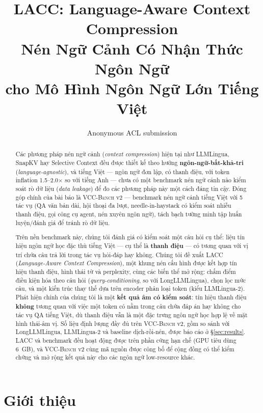 \documentclass[12pt,a4paper]{article}
\title{\textbf{LACC: Language-Aware Context Compression \\
        Nén Ngữ Cảnh Có Nhận Thức Ngôn Ngữ \\
        cho Mô Hình Ngôn Ngữ Lớn Tiếng Việt}}
\author{Anonymous ACL submission}
\date{}
\newcommand{\method}[1]{\textsc{#1}}         %
\begin{document}
\maketitle

\begin{abstract}
Các phương pháp nén ngữ cảnh (\textit{context compression}) hiện tại như LLMLingua, SnapKV hay Selective Context đều được thiết kế theo hướng \textbf{ngôn-ngữ-bất-khả-tri} (\textit{language-agnostic}), và tiếng Việt --- ngôn ngữ đơn lập, có thanh điệu, với token inflation 1.5--2.0$\times$ so với tiếng Anh --- chưa có một benchmark nén ngữ cảnh nào kiểm soát rò dữ liệu (\textit{data leakage}) để đo các phương pháp này một cách đáng tin cậy. Đóng góp chính của bài báo là \method{VCC-Bench} v2 --- benchmark nén ngữ cảnh tiếng Việt với 5 tác vụ (QA văn bản dài, hội thoại đa lượt, needle-in-haystack có kiểm soát nhiễu thanh điệu, gọi công cụ agent, nén xuyên ngôn ngữ), tách bạch tường minh tập huấn luyện/đánh giá để tránh rò dữ liệu.

Trên nền benchmark này, chúng tôi đánh giá có kiểm soát một câu hỏi cụ thể: liệu tín hiệu ngôn ngữ học đặc thù tiếng Việt --- cụ thể là \textbf{thanh điệu} --- có tương quan với vị trí chứa câu trả lời trong tác vụ hỏi-đáp hay không. Chúng tôi đề xuất \method{LACC} (\textit{Language-Aware Context Compression}), một khung nén cấu hình được kết hợp tín hiệu thanh điệu, hình thái từ và perplexity, cùng các biến thể mở rộng: chấm điểm điều kiện hóa theo câu hỏi (\textit{query-conditioning}, so với LongLLMLingua), chọn lọc mức câu, và một kiến trúc thay thế dựa trên encoder phân loại token (kiểu LLMLingua-2). Phát hiện chính của chúng tôi là một \textbf{kết quả âm có kiểm soát}: tín hiệu thanh điệu \textbf{không} tương quan với việc một token có nằm trong câu chứa đáp án hay không cho tác vụ QA tiếng Việt, dù thanh điệu vẫn là một đặc trưng ngôn ngữ học hợp lệ về mặt hình thái-âm vị. Số liệu định lượng đầy đủ trên \method{VCC-Bench} v2, gồm so sánh với LongLLMLingua, LLMLingua-2 và baseline dịch-rồi-nén, được báo cáo ở \S\ref{sec:results}. \method{LACC} và benchmark đều hoạt động được trên phần cứng hạn chế (GPU tiêu dùng 6~GB), và \method{VCC-Bench} v2 cùng mã nguồn được công bố để cộng đồng có thể kiểm chứng và mở rộng kết quả này cho các ngôn ngữ low-resource khác.
\end{abstract}


\section{Giới thiệu}
\label{sec:intro}
\end{document}

